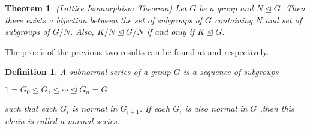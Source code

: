\documentclass[12pt]{report}
\theoremstyle{newthm}
\newtheorem{Theorem}[lem]{Theorem}
\newtheorem{Definition}[lem]{Definition}
\begin{document}
\begin{Theorem}(Lattice Isomorphism Theorem) Let $G$ be a group and $N\trianglelefteq G$. Then there exists a bijection between the set of subgroups of $G$ containing $N$ and set of subgroups of $G/N$. Also, $K/N\trianglelefteq G/N$ if and only if $K\trianglelefteq G$.
\end{Theorem}

The proofs of the previous two results can be found at \cite[pg 98]{DF} and \cite[pg 99]{DF} respectively.


\begin{Definition} A \textit{subnormal series} of a group $G$ is a sequence of subgroups \begin{center}
    $1 = G_0\trianglelefteq G_1\trianglelefteq\dotsi\trianglelefteq G_n = G$
\end{center}
such that each $G_i$ is normal in $G_{i+1}$. If each $G_i$ is also normal in $G$ ,then this chain is called a \textit{normal series}.
\end{Definition}
\end{document}
